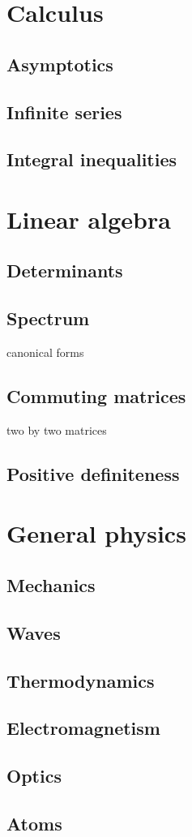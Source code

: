 \documentclass{../../large}
\begin{document}
\chapter{Calculus}
\section{Asymptotics}
\section{Infinite series}
\section{Integral inequalities}



\chapter{Linear algebra}
\section{Determinants}

\section{Spectrum}
canonical forms

\section{Commuting matrices}
two by two matrices

\section{Positive definiteness}


\chapter{General physics}
\section{Mechanics}
\section{Waves}
\section{Thermodynamics}
\section{Electromagnetism}
\section{Optics}
\section{Atoms}
\end{document}
